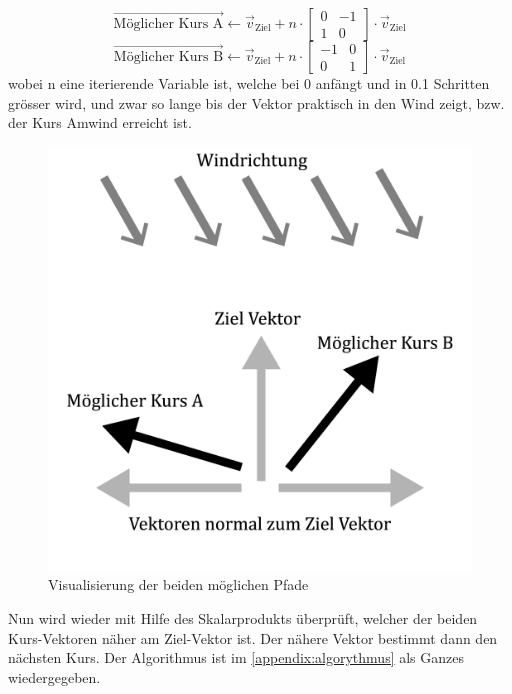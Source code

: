 $$\vec{\text{Möglicher Kurs A}} \gets \vec{v}_{\text{Ziel}} + n \cdot \begin{bmatrix}0 & -1 \\ 1 & 0\end{bmatrix} \cdot \vec{v}_{\text{Ziel}}$$
$$\vec{\text{Möglicher Kurs B}} \gets \vec{v}_{\text{Ziel}} + n \cdot \begin{bmatrix}-1 & 0 \\ 0 & 1\end{bmatrix} \cdot \vec{v}_{\text{Ziel}}$$
wobei n eine iterierende Variable ist, welche bei 0 anfängt und in 0.1 Schritten grösser wird, und zwar so lange bis der Vektor praktisch in den Wind zeigt, bzw. der Kurs Amwind erreicht ist. \\
\begin{figure}[H]
    \centering
    \includegraphics[width=0.5\linewidth]{algorythmus Vektoren.png}
    \caption{Visualisierung der beiden möglichen Pfade}
    \label{fig:enter-label}
\end{figure}
Nun wird wieder mit Hilfe des Skalarprodukts überprüft, welcher der beiden Kurs-Vektoren näher am Ziel-Vektor ist. Der nähere Vektor bestimmt dann den nächsten Kurs. Der Algorithmus ist im \cref{appendix:algorythmus} als Ganzes wiedergegeben.
